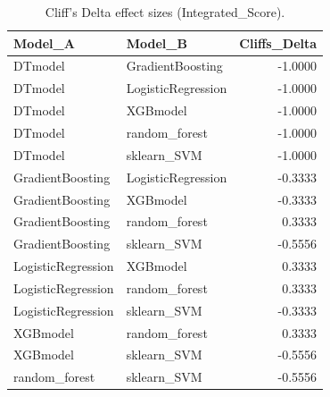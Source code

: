 \begin{table}[t]
\centering
\begin{tabular}{llr}
\toprule
Model_A & Model_B & Cliffs_Delta \\
\midrule
DTmodel & GradientBoosting & -1.0000 \\
DTmodel & LogisticRegression & -1.0000 \\
DTmodel & XGBmodel & -1.0000 \\
DTmodel & random_forest & -1.0000 \\
DTmodel & sklearn_SVM & -1.0000 \\
GradientBoosting & LogisticRegression & -0.3333 \\
GradientBoosting & XGBmodel & -0.3333 \\
GradientBoosting & random_forest & 0.3333 \\
GradientBoosting & sklearn_SVM & -0.5556 \\
LogisticRegression & XGBmodel & 0.3333 \\
LogisticRegression & random_forest & 0.3333 \\
LogisticRegression & sklearn_SVM & -0.3333 \\
XGBmodel & random_forest & 0.3333 \\
XGBmodel & sklearn_SVM & -0.5556 \\
random_forest & sklearn_SVM & -0.5556 \\
\bottomrule
\end{tabular}
\caption{Cliff's Delta effect sizes (Integrated_Score).}
\label{tab:cliffs_Integrated_Score}
\end{table}